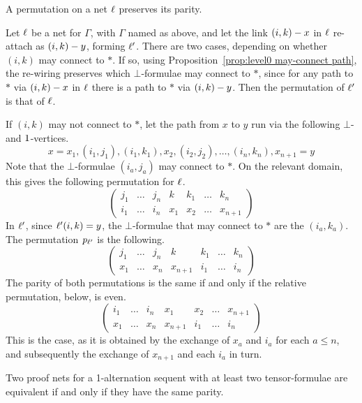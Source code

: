 \documentclass[conference,onecolumn]{IEEEtran}
\begin{document}
\begin{proposition}
\label{prop:level0 min binary}
A permutation on a net $\links$ preserves its parity. 
\end{proposition}


\begin{IEEEproof}
Let $\links$ be a net for $\Gamma$, with $\Gamma$ named as above, and let the link $\edge{(i,k)}x$ in $\links$ re-attach as $\edge{(i,k)}y$, forming $\links'$.
%
There are two cases, depending on whether $(i,k)$ may connect to $*$.
%
If so, using Proposition~\ref{prop:level0 may-connect path}, the re-wiring preserves which $\bot$-formulae may connect to $*$, since for any path to $*$ via $\edge{(i,k)}x$ in $\links$ there is a path to $*$ via $\edge{(i,k)}y$.
%
Then the permutation of $\links'$ is that of $\links$.


If $(i,k)$ may not connect to $*$, let the path from $x$ to $y$ run via the following $\bot$- and $\1$-vertices.
\[
	x=x_1, (i_1,j_1), (i_1,k_1), x_2, (i_2,j_2), \dotsc, (i_n,k_n), x_{n+1}=y 	
\]
Note that the $\bot$-formulae $(i_a,j_a)$ may connect to $*$.
%
On the relevant domain, this gives the following permutation for $\links$.
\[
\left(\begin{array}{ccccccc}
	j_1 & \dotso & j_n &  k  & k_1 & \dotso & k_n \\
	i_1 & \dotso & i_n & x_1 & x_2 & \dotso & x_{n+1}
\end{array}\right)
\]
In $\links'$, since $\links'(i,k)=y$, the $\bot$-formulae that may connect to $*$ are the $(i_a,k_a)$.
%
The permutation $\prm[\links']$ is the following.
\[
\left(\begin{array}{ccccccc}
	j_1 & \dotso & j_n &    k    & k_1 & \dotso & k_n \\
	x_1 & \dotso & x_n & x_{n+1} & i_1 & \dotso & i_n
\end{array}\right)
\]
The parity of both permutations is the same if and only if the relative permutation, below, is even.
\[
\left(\begin{array}{ccccccc}
	i_1 & \dotso & i_n & x_1     & x_2 & \dotso & x_{n+1} \\
	x_1 & \dotso & x_n & x_{n+1} & i_1 & \dotso & i_n
\end{array}\right)
\]
This is the case, as it is obtained by the exchange of $x_a$ and $i_a$ for each $a\leq n$, and subsequently the exchange of $x_{n+1}$ and each $i_a$ in turn.
%
\end{IEEEproof}



\begin{proposition}
\label{prop:parity determines equivalence}
Two proof nets for a 1-alternation sequent with at least two tensor-formulae are equivalent if and only if they have the same parity.
\end{proposition}
\end{document}
